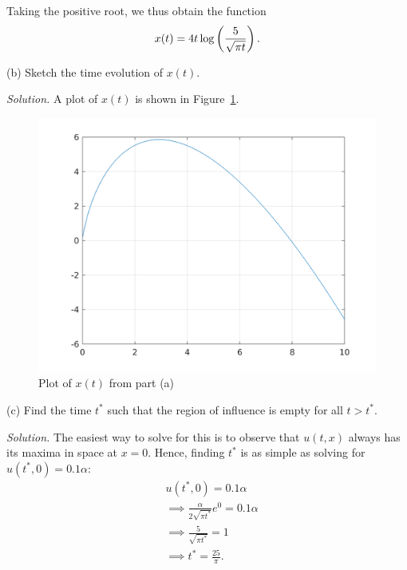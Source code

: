 \documentclass{article}
\begin{document}
Taking the positive root, we thus obtain the function
%
\begin{equation*}
    x(t) = 4 t \log \del{\frac{5}{\sqrt{\pi t}}}
    .
\end{equation*}

\vspace{5mm}

(b) Sketch the time evolution of $x(t)$.

\textit{Solution.}
A plot of $x(t)$ is shown in Figure~\ref{fig:q453b}.

\begin{figure}
    \includegraphics[width=5in]{q453b}
    \centering
    \caption{Plot of $x(t)$ from part (a)}
    \label{fig:q453b}
\end{figure}


\vspace{5mm}

(c) Find the time $t^*$ such that the region of influence is empty for all
$t > t^*$.

\textit{Solution.}
The easiest way to solve for this is to observe that $u(t, x)$ always
has its maxima in space at $x = 0$. Hence, finding $t^*$ is as simple
as solving for $u(t^*, 0) = 0.1 \alpha$:
%
\begin{align*}
    &u(t^*, 0) = 0.1 \alpha \\
    &\implies \frac{\alpha}{2 \sqrt{\pi t^*}} e^0 = 0.1 \alpha \\
    &\implies \frac{5}{\sqrt{\pi t^*}} = 1 \\
    &\implies t^* = \frac{25}{\pi}
    .
\end{align*}

\newpage
\end{document}
